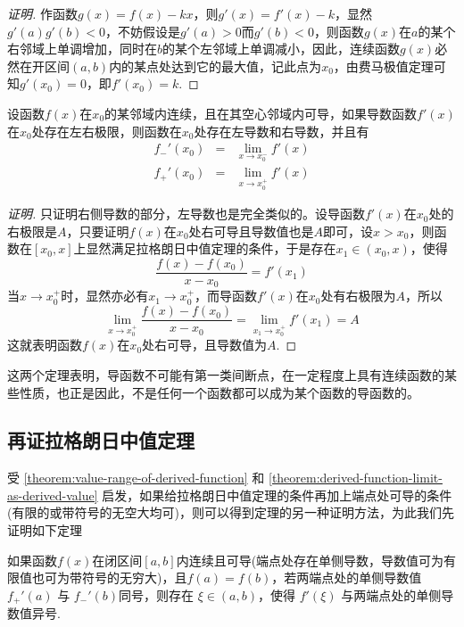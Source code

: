 \begin{proof}[证明]
  作函数$g(x)=f(x)-kx$，则$g'(x)=f'(x)-k$，显然$g'(a)g'(b)<0$，不妨假设是$g'(a)>0$而$g'(b)<0$，则函数$g(x)$在$a$的某个右邻域上单调增加，同时在$b$的某个左邻域上单调减小，因此，连续函数$g(x)$必然在开区间$(a,b)$内的某点处达到它的最大值，记此点为$x_0$，由费马极值定理可知$g'(x_0)=0$，即$f'(x_0)=k$.
\end{proof}

\begin{theorem}
  \label{theorem:derived-function-limit-as-derived-value}
  设函数$f(x)$在$x_0$的某邻域内连续，且在其空心邻域内可导，如果导数函数$f'(x)$在$x_0$处存在左右极限，则函数在$x_0$处存在左导数和右导数，并且有
  \begin{eqnarray*}
   f_-'(x_0) & = & \lim_{x \to x_0^-} f'(x)  \\
   f_+'(x_0) & = & \lim_{x \to x_0^+} f'(x) 
  \end{eqnarray*}
\end{theorem}

\begin{proof}[证明]
  只证明右侧导数的部分，左导数也是完全类似的。设导函数$f'(x)$在$x_0$处的右极限是$A$，只要证明$f(x)$在$x_0$处右可导且导数值也是$A$即可，设$x>x_0$，则函数在$[x_0,x]$上显然满足拉格朗日中值定理的条件，于是存在$x_1 \in (x_0,x)$，使得
  \[ \frac{f(x)-f(x_0)}{x-x_0} = f'(x_1) \]
  当$x \to x_0^+$时，显然亦必有$x_1 \to x_0^+$，而导函数$f'(x)$在$x_0$处有右极限为$A$，所以
  \[ \lim_{x \to x_0^+} \frac{f(x)-f(x_0)}{x-x_0} = \lim_{x_1 \to x_0^+} f'(x_1) = A \]
  这就表明函数$f(x)$在$x_0$处右可导，且导数值为$A$.
\end{proof}

这两个定理表明，导函数不可能有第一类间断点，在一定程度上具有连续函数的某些性质，也正是因此，不是任何一个函数都可以成为某个函数的导函数的。

\subsection{再证拉格朗日中值定理}
\label{sec:second-proof-for-lagrange-middle-value-theorem}

 受 \autoref{theorem:value-range-of-derived-function} 和 \autoref{theorem:derived-function-limit-as-derived-value} 启发，如果给拉格朗日中值定理的条件再加上端点处可导的条件(有限的或带符号的无空大均可)，则可以得到定理的另一种证明方法，为此我们先证明如下定理
\begin{theorem}
  如果函数$f(x)$在闭区间$[a,b]$内连续且可导(端点处存在单侧导数，导数值可为有限值也可为带符号的无穷大)，且$f(a)=f(b)$，若两端点处的单侧导数值$f_{+}'(a)$ 与 $f_-'(b)$同号，则存在 $\xi \in (a,b)$，使得 $f'(\xi)$ 与两端点处的单侧导数值异号. 
\end{theorem}


